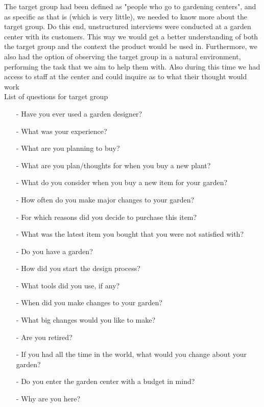 		The target group had been defined as "people who go to gardening centers", and as specific as that is (which is very little), we needed to know more about the target group. Do this end, unstructured interviews were conducted at a garden center with its customers. This way we would get a better understanding of both the target group and the context the product would be used in. Furthermore, we also had the option of observing the target group in a natural environment, performing the task that we aim to help them with. Also during this time we had access to staff at the center and could inquire as to what their thought would work \\
		
		List of questions for target group
		\begin{itemize}
			\item[-] Have you ever used a garden designer?
			\item[-] What was your experience?
			\item[-] What are you planning to buy?
			\item[-] What are you plan/thoughts for when you buy a new plant?
			\item[-] What do you consider when you buy a new item for your garden?
			\item[-] How often do you make major changes to your garden?
			\item[-] For which reasons did you decide to purchase this item?
			\item[-] What was the latest item you bought that you were not satisfied with?
			\item[-] Do you have a garden?
			\item[-] How did you start the design process?
			\item[-] What tools did you use, if any?
			\item[-] When did you make changes to your garden?
			\item[-] What big changes would you like to make?
			\item[-] Are you retired?
			\item[-] If you had all the time in the world, what would you change about your garden?
			\item[-] Do you enter the garden center with a budget in mind?
			\item[-] Why are you here? \\
		\end{itemize}
		
